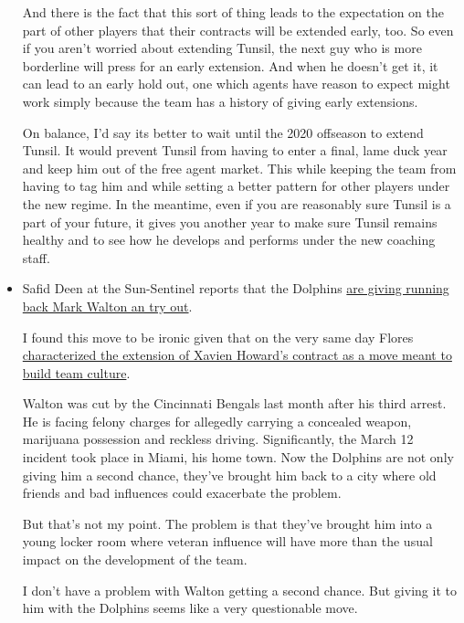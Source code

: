 \documentclass[11pt]{article}
\begin{document}
\begin{itemize}
And there is the fact that this sort of thing leads to the expectation on the part of other players that their contracts will be extended early, too.  So even if you aren't worried about extending Tunsil, the next guy who is more borderline will press for an early extension.  And when he doesn't get it, it can lead to an early hold out, one which agents have reason to expect might work simply because the team has a history of giving early extensions.

On balance, I'd say its better to wait until the 2020 offseason to extend Tunsil.  It would prevent Tunsil from having to enter a final, lame duck year and keep him out of the free agent market.  This while keeping the team from having to tag him and while setting a better pattern for other players under the new regime.  In the meantime, even if you are reasonably sure Tunsil is a part of your future, it gives you another year to make sure Tunsil remains healthy and to see how he develops and performs under the new coaching staff.

\item Safid Deen at the Sun-Sentinel reports that the Dolphins \href{Safid Dee}{are giving running back Mark Walton an try out}.

I found this move to be ironic given that on the very same day Flores \href{https://www.sun-sentinel.com/sports/miami-dolphins/fl-sp-dolphins-xavien-howard-20190510-nmebckxrcnfnpfp2pamje77aeu-story.html}{characterized the extension of Xavien Howard's contract as a move meant to build team culture}.

Walton was cut by the Cincinnati Bengals last month after his third arrest.  He is facing felony charges for allegedly carrying a concealed weapon, marijuana possession and reckless driving. Significantly, the March 12 incident took place in Miami, his home town.  Now the Dolphins are not only giving him a second chance, they've brought him back to a city where old friends and bad influences could exacerbate the problem.

But that's not my point.  The problem is that they've brought him into a young locker room where veteran influence will have more than the usual impact on the development of the team.

I don't have a problem with Walton getting a second chance.  But giving it to him with the Dolphins seems like a very questionable move.
\end{itemize}
\end{document}
